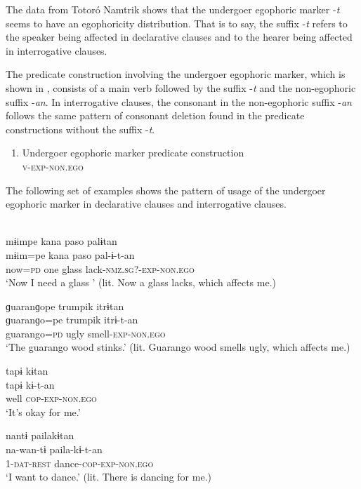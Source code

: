 \documentclass[output=paper]{langsci/langscibook}
\begin{document}
The data from Totoró Namtrik shows that the undergoer egophoric marker -\textit{t} seems to have an egophoricity distribution. That is to say, the suffix -\textit{t} refers to the speaker being affected in declarative clauses and to the hearer being affected in interrogative clauses. 

The predicate construction involving the undergoer egophoric marker, which is shown in , consists of a main verb followed by the suffix -\textit{t} and the non-egophoric suffix -\textit{an}. In interrogative clauses, the consonant in the non-egophoric suffix -\textit{an} follows the same pattern of consonant deletion found in the predicate constructions without the suffix -\textit{t}.

\begin{enumerate}[resume]
    \item Undergoer egophoric marker predicate construction \label{fig:gg5}\\
    \textsc{v-exp-non.ego}
\end{enumerate}

The following set of examples shows the pattern of usage of the undergoer egophoric marker in declarative clauses and interrogative clauses. 
\largerpage[1]


\ea
{}\\ 
	\ea \label{ex:gg68a}
	\glll mɨimpe kana paso palɨtan\\
	mɨim=pe kana paso pal-ɨ-t-an\\
	now=\textsc{pd}	one	glass lack-\textsc{nmz.sg?-exp-non.ego}\\
	\glt ‘Now I need a glass ’ (lit. Now a glass lacks, which affects me.)
	
	\ex \label{ex:gg68b}
	\glll ɡuaranɡope	trumpik	itrɨtan\\
	ɡuaranɡo=pe	trumpik	itrɨ-t-an\\
	guarango=\textsc{pd} ugly smell-\textsc{exp-non.ego}\\
	\glt ‘The guarango wood stinks.’ (lit. Guarango wood smells ugly, which affects me.)
	
	\ex \label{ex:gg68c}
	\glll tapɨ	kɨtan\\
	tapɨ kɨ-t-an\\
	well \textsc{cop-exp-non.ego}\\
	\glt ‘It’s okay for me.’
	
	\ex \label{ex:gg68d}
	\glll nantɨ	pailakɨtan\\
	na-wan-tɨ paila-kɨ-t-an\\
	1-\textsc{dat-rest} dance-\textsc{cop-exp-non.ego}\\
	\glt ‘I want to dance.’ (lit. There is dancing for me.)
\z \z 
\end{document}
